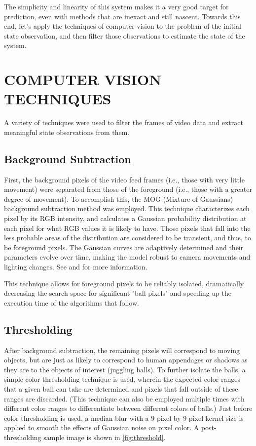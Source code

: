 \documentclass[letterpaper, 10 pt, conference]{ieeeconf}  %
\begin{document}
The simplicity and linearity of this system makes it a very good target for prediction, even with methods that are inexact and still nascent. Towards this end, let's apply the techniques of computer vision to the problem of the initial state observation, and then filter those observations to estimate the state of the system.

\section{COMPUTER VISION TECHNIQUES}

A variety of techniques were used to filter the frames of video data and extract meaningful state observations from them.

\subsection{Background Subtraction}

First, the background pixels of the video feed frames (i.e., those with very little movement) were separated from those of the foreground (i.e., those with a greater degree of movement). To accomplish this, the MOG (Mixture of Gaussians) background subtraction method was employed. This technique characterizes each pixel by its RGB intensity, and calculates a Gaussian probability distribution at each pixel for what RGB values it is likely to have. Those pixels that fall into the less probable areas of the distribution are considered to be transient, and thus, to be foreground pixels. The Gaussian curves are adaptively determined and their parameters evolve over time, making the model robust to camera movements and lighting changes. See \cite{zoran1} and \cite{zoran2} for more information.

This technique allows for foreground pixels to be reliably isolated, dramatically decreasing the search space for significant "ball pixels" and speeding up the execution time of the algorithms that follow.

\subsection{Thresholding}

After background subtraction, the remaining pixels will correspond to moving objects, but are just as likely to correspond to human appendages or shadows as they are to the objects of interest (juggling balls). To further isolate the balls, a simple color thresholding technique is used, wherein the expected color ranges that a given ball can take are determined and pixels that fall outside of these ranges are discarded. (This technique can also be employed multiple times with different color ranges to differentiate between different colors of balls.) Just before color thresholding is used, a median blur with a 9 pixel by 9 pixel kernel size is applied to smooth the effects of Gaussian noise on pixel color. A post-thresholding sample image is shown in \ref{fig:threshold}.
\end{document}
